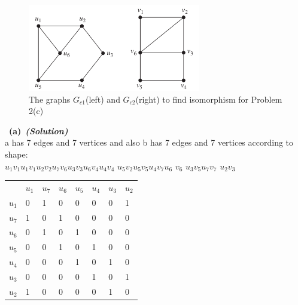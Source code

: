\documentclass[a4 paper]{article}
\newcommand{\subproblem}[1]{~\newline\textbf{(#1)}}
\newcommand{\solutionx}{~\textbf{\textit{(Solution)}} }
\newcommand{\0}{\mathbf{0}}
\begin{document}
\begin{figure}[h]
    \centering
    \includegraphics[height=1.5in]{iso-c.png}
    \caption{The graphs $G_{c1}$(left) and $G_{c2}$(right) to find isomorphism for Problem 2(c)}
    \label{fig:G2c}
\end{figure}

\subproblem{a}\solutionx\\
a has 7 edges and 7 vertices     and also b has 7 edges and 7 vertices according to shape:\\
\newline
$u_1$\qquad$v_1$\qquad            $u_1$\Rightarrow$v_1$\newline$u_2$\qquad        $v_2$\qquad            $u_7$\Rightarrow$v_6$\newline$u_3$\qquad        $v_3$\qquad            $u_6$\Rightarrow$v_4$\newline$u_4$\qquad        $v_4$ \qquad           $u_5$\Rightarrow$v_2$\newline$u_5$\qquad        $v_5$\qquad            $u_4$\Rightarrow$v_7$\newline$u_6$ \qquad       $v_6$ \qquad           $u_3$\Rightarrow$v_5$\newline$u_7$\qquad        $v_7$ \qquad           $u_2$\Rightarrow$v_3$
\begin{table}[]
\begin{tabular}{llllllll}
  & $u_1$ & $u_7$ & $u_6$ & $u_5$ & $u_4$ & $u_3$ & $u_2$ \\
$u_1$ & 0 & 1 & 0 & 0 & 0 & 0 & 1 \\
$u_7$ & 1 & 0 & 1 & 0 & 0 & 0 & 0 \\
$u_6$ & 0 & 1 & 0 & 1 & 0 & 0 & 0 \\
$u_5$ & 0 & 0 & 1 & 0 & 1 & 0 & 0 \\
$u_4$ & 0 & 0 & 0 & 1 & 0 & 1 & 0 \\
$u_3$ & 0 & 0 & 0 & 0 & 1 & 0 & 1 \\
$u_2$ & 1 & 0 & 0 & 0 & 0 & 1 & 0
\end{tabular}
\end{table}
\end{document}
